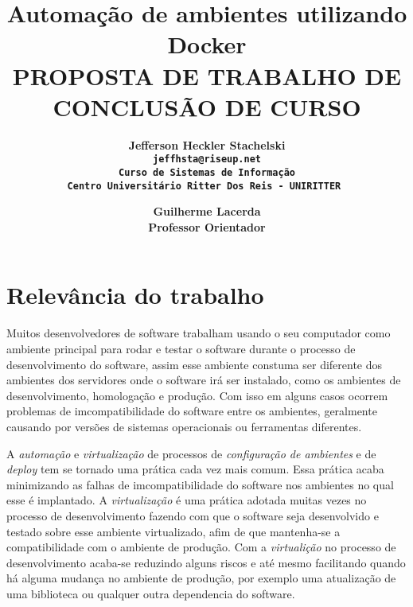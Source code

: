 \documentclass[11pt,a4paper]{article}
\begin{document}
\title{Automação de ambientes utilizando Docker\\ \smallskip
\small{PROPOSTA DE TRABALHO DE CONCLUSÃO DE CURSO}}

\author{ \bf Jefferson Heckler Stachelski\\
    \tt jeffhsta@riseup.net \\
    Curso de Sistemas de Informação \\
    Centro Universitário Ritter Dos Reis - UNIRITTER
    \and
     \bf Guilherme Lacerda\\
    Professor Orientador\\
}

\maketitle
\thispagestyle{empty}

\section{Relevância do trabalho} \label{sec:intro}

Muitos desenvolvedores de software trabalham usando o seu computador como ambiente principal para rodar e testar
o software durante o processo de desenvolvimento do software, assim esse ambiente constuma ser diferente dos ambientes
dos servidores onde o software irá ser instalado, como os ambientes de desenvolvimento, homologação e produção.
Com isso em alguns casos ocorrem problemas de imcompatibilidade do software entre os ambientes, geralmente causando
por versões de sistemas operacionais ou ferramentas diferentes.

A \textit{automação} e \textit{virtualização} de processos de \textit{configuração de ambientes} e de \textit{deploy} tem
se tornado uma prática cada vez mais comum. Essa prática acaba minimizando as falhas de imcompatibilidade do software
nos ambientes no qual esse é implantado\cite{Fowler_continuos_integration}. A \textit{virtualização} é uma prática adotada muitas vezes no processo
de desenvolvimento fazendo com que o software seja desenvolvido e testado sobre esse ambiente virtualizado, afim de
que mantenha-se a compatibilidade com o ambiente de produção. Com a \textit{virtualição} no processo de desenvolvimento
acaba-se reduzindo alguns riscos e até mesmo facilitando quando há alguma mudança no ambiente de produção, por exemplo
uma atualização de uma biblioteca ou qualquer outra dependencia do software\cite{Fowler_continuos_integration}.
\end{document}

